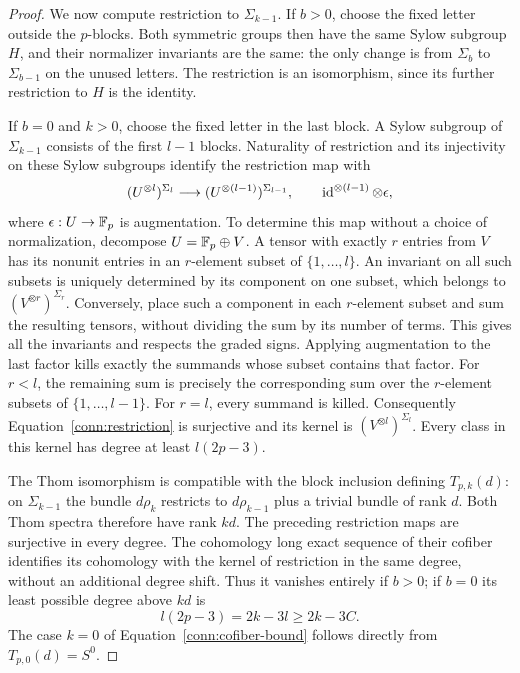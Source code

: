 \begin{proof}
We now compute restriction to $\Sigma_{k-1}$. If $b>0$, choose
the fixed letter outside the $p$-blocks. Both symmetric groups
then have the same Sylow subgroup $H$, and their normalizer
invariants are the same: the only change is from $\Sigma_b$ to
$\Sigma_{b-1}$ on the unused letters. The restriction is an
isomorphism, since its further restriction to $H$ is the identity.

If $b=0$ and $k>0$, choose the fixed letter in the last block.
A Sylow subgroup of $\Sigma_{k-1}$ consists of the first $l-1$
blocks. Naturality of restriction and its injectivity on these
Sylow subgroups identify the restriction map with
\begin{equation}\label{conn:restriction}
 (U^{\otimes l})^{\Sigma_l}
 \longrightarrow (U^{\otimes(l-1)})^{\Sigma_{l-1}},
 \qquad \operatorname{id}^{\otimes(l-1)}\otimes\epsilon,
\end{equation}
where $\epsilon:U\to\mathbb F_p$ is augmentation.
To determine this map without a choice of normalization, decompose
$U=\mathbb F_p\oplus V$. A tensor with exactly $r$ entries from $V$
has its nonunit entries in an $r$-element subset of $\{1,\ldots,l\}$.
An invariant on all such subsets is uniquely determined by its
component on one subset, which belongs to
$(V^{\otimes r})^{\Sigma_r}$. Conversely, place such a component
in each $r$-element subset and sum the resulting tensors, without
dividing the sum by its number of terms. This gives all the
invariants and respects the graded signs. Applying augmentation
to the last factor kills exactly the summands whose subset
contains that factor. For $r<l$, the remaining sum is precisely
the corresponding sum over the $r$-element subsets of
$\{1,\ldots,l-1\}$. For $r=l$, every summand is killed.
Consequently Equation~\eqref{conn:restriction} is surjective and
its kernel is $(V^{\otimes l})^{\Sigma_l}$. Every class in this
kernel has degree at least $l(2p-3)$.

The Thom isomorphism is compatible with the block inclusion
defining $T_{p,k}(d)$: on $\Sigma_{k-1}$ the bundle $d\rho_k$
restricts to $d\rho_{k-1}$ plus a trivial bundle of rank $d$.
Both Thom spectra therefore have rank $kd$. The preceding
restriction maps are surjective in every degree. The cohomology
long exact sequence of their cofiber identifies its cohomology
with the kernel of restriction in the same degree, without an
additional degree shift. Thus it vanishes entirely if $b>0$;
if $b=0$ its least possible degree above $kd$ is
\[
 l(2p-3)=2k-3l\geq2k-3C.
\]
The case $k=0$ of Equation~\eqref{conn:cofiber-bound} follows
directly from $T_{p,0}(d)=S^0$.


\end{proof}

